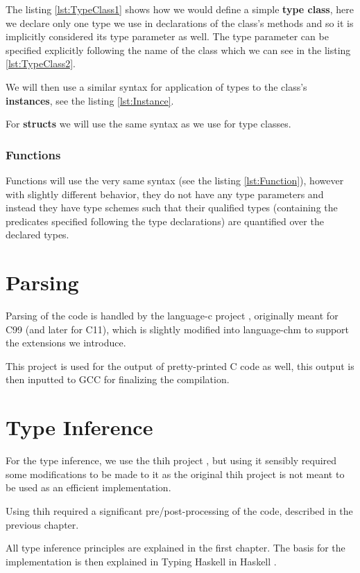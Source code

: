 The listing \ref{lst:TypeClass1} shows how we would define a simple \textbf{type class}, here we declare only one type we use in declarations of the class's methods and so it is implicitly considered its type parameter as well. The type parameter can be specified explicitly following the name of the class which we can see in the listing \ref{lst:TypeClass2}.

We will then use a similar syntax for application of types to the class's \textbf{instances}, see the listing \ref{lst:Instance}.

For \textbf{structs} we will use the same syntax as we use for type classes.

\subsubsection{Functions}

Functions will use the very same syntax (see the listing \ref{lst:Function}), however with slightly different behavior, they do not have any type parameters and instead they have type schemes such that their qualified types (containing the predicates specified following the type declarations) are quantified over the declared types.

\section{Parsing}

Parsing of the code is handled by the language-c project \cite{visq2018language-c}, originally meant for C99 (and later for C11), which is slightly modified into language-chm to support the extensions we introduce.

This project is used for the output of pretty-printed C code as well, this output is then inputted to GCC for finalizing the compilation.

\section{Type Inference}

For the type inference, we use the thih project \cite{jones1999typing}, but using it sensibly required some modifications to be made to it as the original thih project is not meant to be used as an efficient implementation.

Using thih required a significant pre/post-processing of the code, described in the previous chapter.

All type inference principles are explained in the first chapter. The basis for the implementation is then explained in Typing Haskell in Haskell \cite{jones1999typing}.


